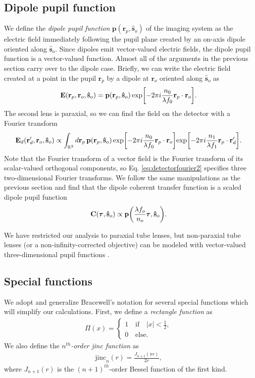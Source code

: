 \documentclass[]{osa-article}
\let\originalleft\left
\let\originalright\right
\renewcommand{\left}{\mathopen{}\mathclose\bgroup\originalleft}
\renewcommand{\right}{\aftergroup\egroup\originalright}
\providecommand{\mb}[1]{\mathbf{#1}}
\providecommand{\ro}{\mathbf{\mathbf{r}}_o}
\providecommand{\so}{\mathbf{\hat{s}}_o}
\providecommand{\rp}{\mathbf{r}_p}
\providecommand{\rd}{\mathbf{r}_d}
\providecommand{\mbb}[1]{\mathbb{#1}}
\providecommand{\bs}[1]{\boldsymbol{#1}}
\providecommand{\taup}{\bs{\tau}}
\begin{document}
\subsection{Dipole pupil function}
We define the \textit{dipole pupil function} $\mb{p}(\rp, \so)$ of the imaging
system as the electric field immediately following the pupil plane created by
an on-axis dipole oriented along $\so$. Since dipoles emit vector-valued
electric fields, the dipole pupil function is a vector-valued function. Almost
all of the arguments in the previous section carry over to the dipole case.
Briefly, we can write the electric field created at a point in the pupil
$\rp$ by a dipole at $\ro$ oriented along $\so$ as
 \begin{align}
   \mb{E}(\rp, \ro, \so) = \mb{p}(\rp, \so)\,\text{exp}\left[-2\pi i \frac{n_0}{\lambda f_0} \rp\cdot\ro \right]. \label{eq:pupil2}
 \end{align}
 The second lens is paraxial, so we can find the field on the detector with a
 Fourier transform
 \begin{align}
   \mb{E}_d(\rd', \ro, \so) \propto \int_{\mbb{R}^2}d\rp\, \mb{p}(\rp, \so)\,\text{exp}\left[-2\pi i \frac{n_0}{\lambda f_0} \rp\cdot\ro \right]\text{exp}\left[-2\pi i \frac{n_1}{\lambda f_1} \rp\cdot\rd' \right]. \label{eq:detectorfourier2}
\end{align}
Note that the Fourier transform of a vector field is the Fourier transform of
its scalar-valued orthogonal components, so Eq. \eqref{eq:detectorfourier2}
specifies three two-dimensional Fourier transforms. We follow the same
manipulations as the previous section and find that the dipole coherent transfer
function is a scaled dipole pupil function
\begin{align}
  \mb{C}(\taup, \so) \propto \mb{p}\left(\frac{\lambda f_o}{n_o}\taup, \so\right). \label{eq:monopupildip}
\end{align}

We have restricted our analysis to paraxial tube lenses, but non-paraxial tube
lenses (or a non-infinity-corrected objective) can be modeled with vector-valued
three-dimensional pupil functions \cite{sheppard1994, gu2000, arnison2002,
  foreman2011-2}.

\subsection{Special functions}
We adopt and generalize Bracewell's notation \cite{bracewell2004} for several
special functions which will simplify our calculations. First, we define a
\textit{rectangle function} as
\begin{align}
  \Pi(x) = 
  \begin{cases}
    1\quad \text{if}\quad |x| < \frac{1}{2},\\
    0\quad \text{else}.
  \end{cases}
\end{align}
We also define the \textit{$n^{th}$-order jinc function} as
\begin{align}
  \text{jinc}_n(r) = \frac{J_{n+1}(\pi r)}{2r},
\end{align}
where $J_{n+1}(r)$ is the $(n+1)^{th}$-order Bessel function of the first kind.
\end{document}

